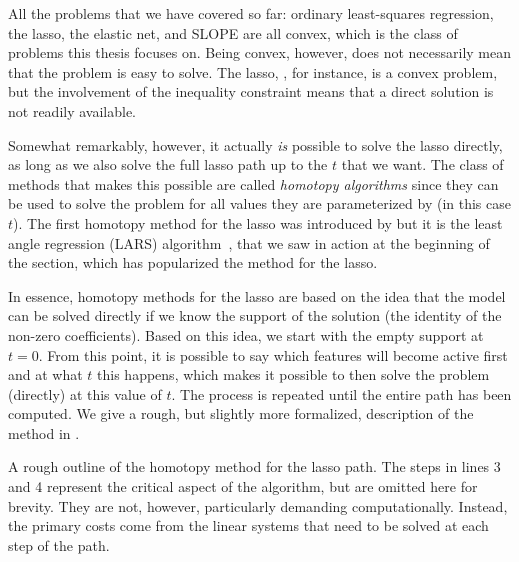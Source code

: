 All the problems that we have covered so far: ordinary least-squares regression, the lasso, the elastic net, and SLOPE are all convex, which is the class of problems this thesis focuses on. Being convex, however, does not necessarily mean that the problem is easy to solve. The lasso, , for instance, is a convex problem, but the involvement of the inequality constraint means that a direct solution is not readily available.

Somewhat remarkably, however, it actually \emph{is} possible to solve the lasso directly, as long as we also solve the full lasso path up to the \(t\) that we want. The class of methods that makes this possible are called \emph{homotopy algorithms} since they can be used to solve the problem for all values they are parameterized by (in this case \(t\)). The first homotopy method for the lasso was introduced by \textcite{osborne2000,osborne2000a} but it is the least angle regression (LARS) algorithm~\parencite{efron2004}, that we saw in action at the beginning of the section, which has popularized the method for the lasso.

In essence, homotopy methods for the lasso are based on the idea that the model can be solved directly if we know the support of the solution (the identity of the non-zero coefficients). Based on this idea, we start with the empty support at \(t=0\). From this point, it is possible to say which features will become active first and at what \(t\) this happens, which makes it possible to then solve the problem (directly) at this value of \(t\). The process is repeated until the entire path has been computed. We give a rough, but slightly more formalized, description of the method in .

\begin{algorithm}
  \caption{A rough outline of the homotopy method for the lasso path. The steps in lines 3 and 4 represent the critical aspect of the algorithm, but are omitted here for brevity. They are not, however, particularly demanding computationally. Instead, the primary costs come from the linear systems that need to be solved at each step of the path.}
  \label{alg:homotopy}
\end{algorithm}

